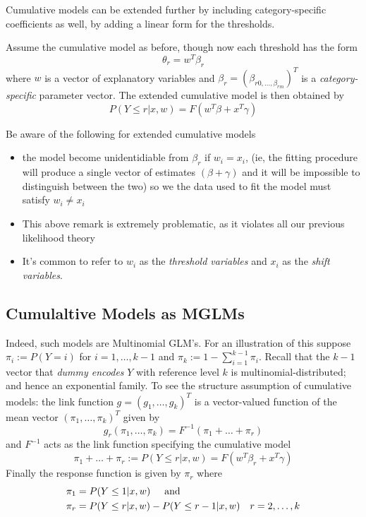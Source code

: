 Cumulative models can be extended further by including category-specific coefficients as well, by adding a linear form for the thresholds. 
\begin{definition}
    Assume the cumulative model as before, though now each threshold has the form 
    $$\theta_r = w^T\beta_r$$
    where $w$ is a vector of explanatory variables and $\beta_r = (\beta_{r0, \dots, \beta_{rm}})^T$ is a \textit{category-specific} parameter vector. The extended cumulative model is then obtained by 
    $$P(Y\leq r | x,w) = F(w^T\beta + x^T\gamma)$$
\end{definition}
\begin{remark}
    Be aware of the following for extended cumulative models \begin{itemize}
        \item the model become unidentidiable from $\beta_r$ if $w_i = x_i$, (ie, the fitting procedure will produce a single vector of estimates $(\beta + \gamma)$ and it will be impossible to distinguish between the two)  so we the data used to fit the model must satisfy $w_i \neq x_i$
        \item This above remark is extremely problematic, as it violates all our previous likelihood theory 
        \item It's common to refer to $w_i$ as the \textit{threshold variables} and $x_i$ as the \textit{shift variables}.
    \end{itemize}
\end{remark}


\subsection{Cumulaltive Models as MGLMs}
Indeed, such models are Multinomial GLM's. For an illustration of this suppose $\pi_i := P(Y=i)$ for $i=1,\dots,k-1$ and $\pi_k := 1 - \sum_{i=1}^{k-1}\pi_i$. Recall that the $k-1$ vector that \textit{dummy encodes} $Y$ with reference level $k$ is multinomial-distributed; and hence an exponential family. To see the structure assumption of cumulative models: the link function $g = (g_1,\dots,g_k)^T$ is a vector-valued function of the mean vector $(\pi_1,\dots,\pi_k)^T$ given by 
$$g_r(\pi_1,\dots,\pi_{k}) = F^{-1}(\pi_1+\dots+\pi_r)$$
and $F^{-1}$ acts as the link function specifying the cumulative model 
$$\pi_1 + \dots + \pi_r := P(Y\leq r|x,w) = F( w^T\beta_r + x^T\gamma )$$
Finally the response function is given by $\pi_r$ where
\begin{align*}
    & \pi_1 = P(Y\leq 1 | x,w) \hspace{5mm} \text{and} \\
    & \pi_r = P(Y\leq r | x,w) - P(Y\leq r-1|x,w) \quad r=2,\dots,k
\end{align*}

